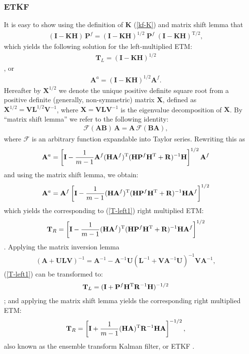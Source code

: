 \documentclass[11pt]{report}
\newcommand{\mb} {\mathbf}
\newcommand{\T}{^{\tiny \mathrm T}}
\newcommand{\TS}{^{{\mathrm T}/2}}
\begin{document}
\subsubsection{ETKF}

It is easy to show using the definition of $\mb K$ (\ref{kf-K}) and matrix shift lemma that 
\begin{align*}
    (\mb I - \mb K \mb H) \, \mb P^f = (\mb I - \mb K \mb H)^{1/2} \; \mb P^f \; (\mb I - \mb K \mb H)\TS,
\end{align*}
which yields the following solution for the left-multiplied ETM:
\begin{align}
  \label{T-left1}
  \mb T_L = (\mb I - \mb K \mb H)^{1/2}
\end{align}
\citep{sak08b}, or
\begin{align*}
  \mb A^a =  (\mb I - \mb K \mb H)^{1/2} \mb A^f.
\end{align*}
Hereafter by $\mb X^{1/2}$ we denote the unique positive definite square root from a positive definite (generally, non-symmetric) matrix $\mb X$, defined as $\mb X^{1/2} = \mb V \mb L^{1/2} \mb V^{-1}$, where $\mb X = \mb V \mb L \mb V^{-1}$ is the eigenvalue decomposition of $\mb X$.
By ``matrix shift lemma'' we refer to the following identity:
\begin{align}
  \label{shift}
  \mathcal F(\mb A \mb B) \, \mb A = \mb A \, \mathcal F(\mb B \mb A),
\end{align}
where $\mathcal F$ is an arbitrary function expandable into Taylor series.
Rewriting this as
\begin{align*}
  \mb A^a = \left[ \mb I - \frac{1}{m-1} \mb A^f (\mb H \mb A^f)\T  (\mb H \mb P^f \mb H\T + \mb R)^{-1} \mb H \right]^{1/2} \mb A^f
\end{align*}
and using the matrix shift lemma, we obtain:
\begin{align*}
  \mb A^a = \mb A^f \left[ \mb I - \frac{1}{m-1} (\mb H \mb A^f)\T  (\mb H \mb P^f \mb H\T + \mb R)^{-1} \mb H \mb A^f \right]^{1/2}
\end{align*}
which yields the corresponding to (\ref{T-left1}) right multiplied ETM:
\begin{align}
  \label{T-right1}
  \mb T_R = \left[ \mb I -  \frac{1}{m-1} (\mb H \mb A^f)\T  (\mb H \mb P^f \mb H\T + \mb R)^{-1} \mb H \mb A^f \right]^{1/2}
\end{align}
\citep{eve04a}.
Applying the matrix inversion lemma
\begin{align}
  \label{inv}
  (\mb A + \mb U \mb L \mb V)^{-1} = \mb A^{-1} - \mb A^{-1} \mb U (\mb L^{-1} + \mb V \mb A^{-1} \mb U)^{-1} \mb V \mb A^{-1},
\end{align}
(\ref{T-left1}) can be transformed to:
\begin{align}
  \label{T-left2}
  \mb T_L = (\mb I + \mb P^f \mb H\T \mb R^{-1} \mb H)^{-1/2}
\end{align}
\citep{sak11a}; and applying the matrix shift lemma yields the corresponding right multiplied ETM:
\begin{align}
  \label{etkf}
  \mb T_R = \left[\mb I +  \frac{1}{m-1} (\mb H \mb A)\T \mb R^{-1} \mb H \mb A\right]^{-1/2},
\end{align}
also known as the ensemble transform Kalman filter, or ETKF \citep{bis01a}.
\end{document}
